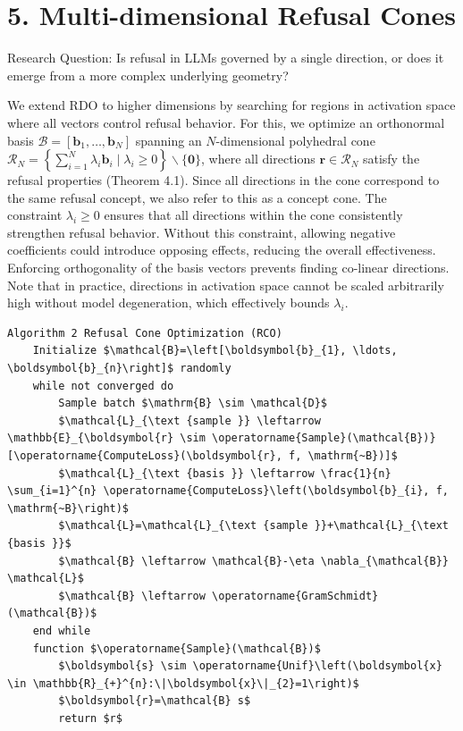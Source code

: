 \documentclass[10pt]{article}
\begin{document}
\section*{5. Multi-dimensional Refusal Cones}
Research Question: Is refusal in LLMs governed by a single direction, or does it emerge from a more complex underlying geometry?

We extend RDO to higher dimensions by searching for regions in activation space where all vectors control refusal behavior. For this, we optimize an orthonormal basis $\mathcal{B}=\left[\boldsymbol{b}_{1}, \ldots, \boldsymbol{b}_{N}\right]$ spanning an $N$-dimensional polyhedral cone $\mathcal{R}_{N}=\left\{\sum_{i=1}^{N} \lambda_{i} \boldsymbol{b}_{i} \mid \lambda_{i} \geq 0\right\} \backslash\{\mathbf{0}\}$, where all directions $\boldsymbol{r} \in \mathcal{R}_{N}$ satisfy the refusal properties (Theorem 4.1). Since all directions in the cone correspond to the same refusal concept, we also refer to this as a concept cone. The\\
constraint $\lambda_{i} \geq 0$ ensures that all directions within the cone consistently strengthen refusal behavior. Without this constraint, allowing negative coefficients could introduce opposing effects, reducing the overall effectiveness. Enforcing orthogonality of the basis vectors prevents finding co-linear directions. Note that in practice, directions in activation space cannot be scaled arbitrarily high without model degeneration, which effectively bounds $\lambda_{i}$.

\begin{verbatim}
Algorithm 2 Refusal Cone Optimization (RCO)
    Initialize $\mathcal{B}=\left[\boldsymbol{b}_{1}, \ldots, \boldsymbol{b}_{n}\right]$ randomly
    while not converged do
        Sample batch $\mathrm{B} \sim \mathcal{D}$
        $\mathcal{L}_{\text {sample }} \leftarrow \mathbb{E}_{\boldsymbol{r} \sim \operatorname{Sample}(\mathcal{B})}[\operatorname{ComputeLoss}(\boldsymbol{r}, f, \mathrm{~B})]$
        $\mathcal{L}_{\text {basis }} \leftarrow \frac{1}{n} \sum_{i=1}^{n} \operatorname{ComputeLoss}\left(\boldsymbol{b}_{i}, f, \mathrm{~B}\right)$
        $\mathcal{L}=\mathcal{L}_{\text {sample }}+\mathcal{L}_{\text {basis }}$
        $\mathcal{B} \leftarrow \mathcal{B}-\eta \nabla_{\mathcal{B}} \mathcal{L}$
        $\mathcal{B} \leftarrow \operatorname{GramSchmidt}(\mathcal{B})$
    end while
    function $\operatorname{Sample}(\mathcal{B})$
        $\boldsymbol{s} \sim \operatorname{Unif}\left(\boldsymbol{x} \in \mathbb{R}_{+}^{n}:\|\boldsymbol{x}\|_{2}=1\right)$
        $\boldsymbol{r}=\mathcal{B} s$
        return $r$
\end{verbatim}
\end{document}
